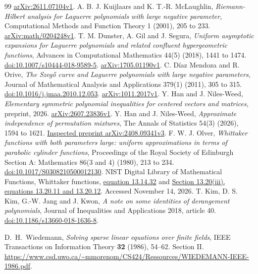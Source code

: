 \documentclass[11pt]{article}
\theoremstyle{definition}
\theoremstyle{remark}
\newcommand{\1}{\mathbf 1}
\begin{document}
\begin{thebibliography}{99}
\href{https://arxiv.org/abs/2611.07104v1}{arXiv:2611.07104v1}.
A. B. J. Kuijlaars and K. T.-R. McLaughlin, \emph{Riemann-Hilbert analysis for Laguerre polynomials with large negative parameter}, Computational Methods and Function Theory 1 (2001), 205 to 233.
\href{https://arxiv.org/abs/math/0204248v1}{arXiv:math/0204248v1}.
T. M. Dunster, A. Gil and J. Segura, \emph{Uniform asymptotic expansions for Laguerre polynomials and related confluent hypergeometric functions}, Advances in Computational Mathematics 44(5) (2018), 1441 to 1474.
\href{https://doi.org/10.1007/s10444-018-9589-5}{doi:10.1007/s10444-018-9589-5}.
\href{https://arxiv.org/abs/1705.01190v1}{arXiv:1705.01190v1}.
C. D\'iaz Mendoza and R. Orive, \emph{The Szeg\H{o} curve and Laguerre polynomials with large negative parameters}, Journal of Mathematical Analysis and Applications 379(1) (2011), 305 to 315.
\href{https://doi.org/10.1016/j.jmaa.2010.12.053}{doi:10.1016/j.jmaa.2010.12.053}.
\href{https://arxiv.org/abs/1011.2017v1}{arXiv:1011.2017v1}.
Y. Han and J. Niles-Weed, \emph{Elementary symmetric polynomial inequalities for centered vectors and matrices}, preprint, 2026.
\href{https://arxiv.org/abs/2607.23836v1}{arXiv:2607.23836v1}.
Y. Han and J. Niles-Weed, \emph{Approximate independence of permutation mixtures}, The Annals of Statistics 54(3) (2026), 1594 to 1621.
\href{https://arxiv.org/abs/2408.09341v3}{Inspected preprint arXiv:2408.09341v3}.
F. W. J. Olver, \emph{Whittaker functions with both parameters large: uniform approximations in terms of parabolic cylinder functions}, Proceedings of the Royal Society of Edinburgh Section A: Mathematics 86(3 and 4) (1980), 213 to 234.
\href{https://doi.org/10.1017/S0308210500012130}{doi:10.1017/S0308210500012130}.
NIST Digital Library of Mathematical Functions, Whittaker functions,
\href{https://dlmf.nist.gov/13.14.E32}{equation 13.14.32} and
\href{https://dlmf.nist.gov/13.20.iii}{Section 13.20(iii), equations 13.20.11 and 13.20.12}.
Accessed November 14, 2026.
T. Kim, D. S. Kim, G.-W. Jang and J. Kwon, \emph{A note on some identities of derangement polynomials}, Journal of Inequalities and Applications 2018, article 40.
\href{https://doi.org/10.1186/s13660-018-1636-8}{doi:10.1186/s13660-018-1636-8}.

D.~H.~Wiedemann, \emph{Solving sparse linear equations over finite fields},
IEEE Transactions on Information Theory \textbf{32} (1986), 54--62.
Section II.
\url{https://www.csd.uwo.ca/~mmorenom/CS424/Ressources/WIEDEMANN-IEEE-1986.pdf}.


\end{thebibliography}
\end{document}
